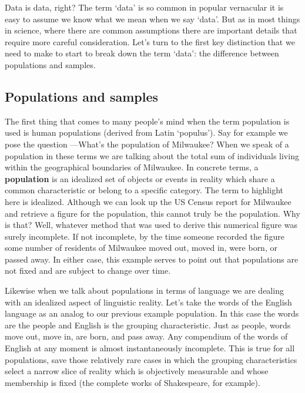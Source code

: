\documentclass[
  letterpaper,
  krantz1]{latex/krantz-mod}
\theoremstyle{definition}
\theoremstyle{definition}
\theoremstyle{remark}
\begin{document}
Data is data, right? The term `data' is so common in popular vernacular
it is easy to assume we know what we mean when we say `data'. But as in
most things in science, where there are common assumptions there are
important details that require more careful consideration. Let's turn to
the first key distinction that we need to make to start to break down
the term `data': the difference between populations and samples.

\subsection{Populations and samples}\label{populations-and-samples}

The first thing that comes to many people's mind when the term
population is used is human populations (derived from Latin `populus').
Say for example we pose the question ---What's the population of
Milwaukee? When we speak of a population in these terms we are talking
about the total sum of individuals living within the geographical
boundaries of Milwaukee. In concrete terms, a \textbf{population}
 is an idealized set of objects or events in reality
which share a common characteristic or belong to a specific category.
The term to highlight here is idealized. Although we can look up the US
Census report for Milwaukee and retrieve a figure for the population,
this cannot truly be the population. Why is that? Well, whatever method
that was used to derive this numerical figure was surely incomplete. If
not incomplete, by the time someone recorded the figure some number of
residents of Milwaukee moved out, moved in, were born, or passed away.
In either case, this example serves to point out that populations are
not fixed and are subject to change over time.

Likewise when we talk about populations in terms of language we are
dealing with an idealized aspect of linguistic reality. Let's take the
words of the English language as an analog to our previous example
population. In this case the words are the people and English is the
grouping characteristic. Just as people, words move out, move in, are
born, and pass away. Any compendium of the words of English at any
moment is almost instantaneously incomplete. This is true for all
populations, save those relatively rare cases in which the grouping
characteristics select a narrow slice of reality which is objectively
measurable and whose membership is fixed (the complete works of
Shakespeare, for example).
\end{document}
